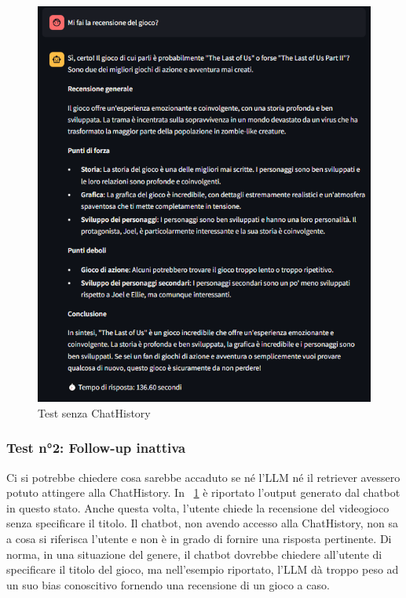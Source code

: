 \begin{figure}[!t]
    \centering
    \includegraphics[width=\textwidth]{Images/cap5/recensione_no_history.PNG}
    \caption{Test senza ChatHistory}
    \label{fig:history3}
\end{figure}

\subsubsection{Test n°2: Follow-up inattiva}
Ci si potrebbe chiedere cosa sarebbe accaduto se né l'LLM né il retriever avessero potuto attingere alla ChatHistory. In \figurename{~\ref{fig:history3}} è riportato l'output generato dal chatbot in questo stato. Anche questa volta, l'utente chiede la recensione del videogioco senza specificare il titolo. Il chatbot, non avendo accesso alla ChatHistory, non sa a cosa si riferisca l'utente e non è in grado di fornire una risposta pertinente. Di norma, in una situazione del genere, il chatbot dovrebbe chiedere all'utente di specificare il titolo del gioco, ma nell'esempio riportato, l'LLM dà troppo peso ad un suo bias conoscitivo fornendo una recensione di un gioco a caso.

